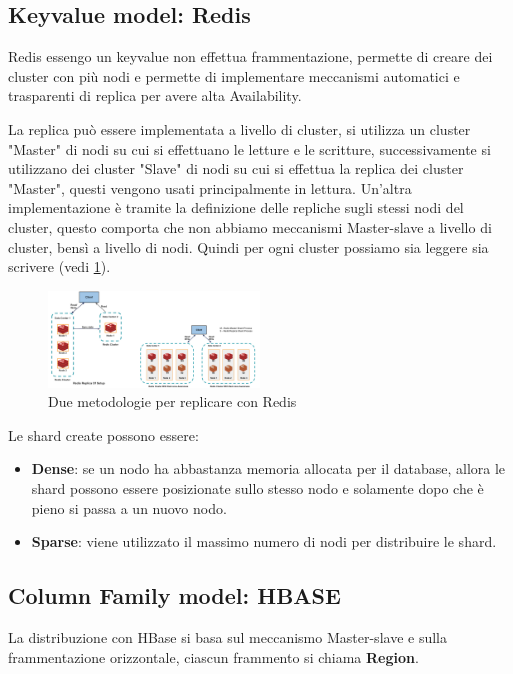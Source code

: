       \subsection{Keyvalue model: Redis}
      Redis essengo un keyvalue non effettua frammentazione, permette di creare dei
      cluster con più nodi e permette di implementare meccanismi automatici e trasparenti
      di replica per avere alta Availability.

      La replica può essere implementata a livello di cluster, si utilizza un cluster
      "Master" di nodi su cui si effettuano le letture e le scritture, successivamente
      si utilizzano dei cluster "Slave" di nodi su cui si effettua la replica dei cluster
      "Master", questi vengono usati principalmente in lettura. Un'altra implementazione
      è tramite la definizione delle repliche sugli stessi nodi del cluster, questo
      comporta che non abbiamo meccanismi Master-slave a livello di cluster, bensì a
      livello di nodi. Quindi per ogni cluster possiamo sia leggere sia scrivere
      (vedi \ref{fig:dist_redis}).
      \begin{figure} [!ht]
            \centering
            \includegraphics[width=0.5\textwidth]{img/nosql/redis_distribuited.png}
            \caption{Due metodologie per replicare con Redis}
            \label{fig:dist_redis}
      \end{figure}

      Le shard create possono essere:
      \begin{itemize}
            \item \textbf{Dense}: se un nodo ha abbastanza memoria allocata per il
                  database, allora le shard possono essere posizionate sullo stesso nodo
                  e solamente dopo che è pieno si passa a un nuovo nodo.
            \item \textbf{Sparse}: viene utilizzato il massimo numero di nodi per
                  distribuire le shard.
      \end{itemize}
      \subsection{Column Family model: HBASE}
      La distribuzione con HBase si basa sul meccanismo Master-slave e sulla frammentazione
      orizzontale, ciascun frammento si chiama \textbf{Region}.

